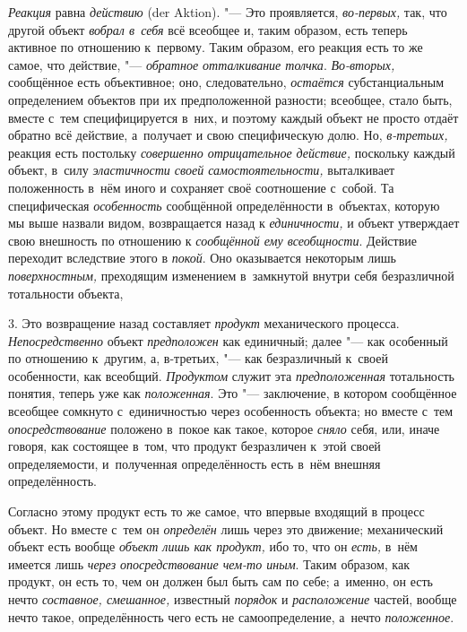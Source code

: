 {\em Реакция} равна
{\em действию} (der Aktion). "---
Это проявляется,
{\em во-первых,}
так, что другой объект
{\em вобрал в~себя} всё
всеобщее и, таким образом, есть теперь активное по отношению к~первому.
Таким образом, его реакция есть то же самое, что действие, "---
{\em обратное отталкивание толчка}.
{\em Во-вторых,}
сообщённое есть объективное; оно, следовательно,
{\em остаётся}
субстанциальным определением объектов при их предположенной
разности; всеобщее, стало быть, вместе с~тем специфицируется в~них, и
поэтому каждый объект не просто отдаёт обратно всё действие, а~получает и
свою специфическую долю. Но,
{\em в-третьих,} реакция
есть постольку {\em совершенно
отрицательное действие,} поскольку каждый объект, в~силу
{\em эластичности своей
самостоятельности,} выталкивает положенность в~нём иного и
сохраняет своё соотношение с~собой. Та специфическая
{\em особенность}
сообщённой определённости в~объектах, которую мы выше назвали
видом, возвращается назад к
{\em единичности,} и
объект утверждает свою внешность по отношению к
{\em сообщённой ему всеобщности}.
Действие переходит вследствие этого в
{\em покой}. Оно
оказывается некоторым лишь
{\em поверхностным,}
преходящим изменением в~замкнутой внутри себя безразличной
тотальности объекта,

3. Это возвращение назад составляет
{\em продукт}
механического процесса. {\em Непосредственно} объект {\em предположен}
как единичный; далее "--- как особенный по отношению к~другим, а,
в-третьих, "--- как безразличный к~своей особенности, как всеобщий.
{\em Продуктом} служит эта {\em предположенная} тотальность понятия,
теперь уже как {\em положенная}. Это "--- заключение,
в котором сообщённое всеобщее сомкнуто с~единичностью через
особенность объекта; но вместе с~тем {\em опосредствование}
положено в~покое как такое, которое {\em сняло} себя, или,
иначе говоря, как состоящее в~том, что продукт безразличен к~этой своей
определяемости, и~полученная определённость есть в~нём внешняя определённость.

Согласно этому продукт есть то же самое, что впервые входящий
в процесс объект. Но вместе с~тем он {\em определён} лишь
через это движение; механический объект есть вообще
{\em объект лишь как продукт,} ибо то, что он {\em есть,} в~нём имеется
лишь {\em через опосредствование
чем-то иным}. Таким образом, как продукт, он есть то,
чем он должен был быть сам по себе; а~именно, он есть нечто
{\em составное, смешанное,} известный {\em порядок} и {\em расположение}
частей, вообще нечто такое, определённость чего есть не
самоопределение, а~нечто {\em положенное}.

